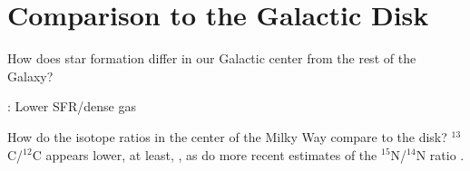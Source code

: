 \section{Comparison to the Galactic Disk}
How does star formation differ in our Galactic center from the rest of the Galaxy? 

\citet{Longmore2013b}: Lower SFR/dense gas

How do the isotope ratios in the center of the Milky Way compare to the disk? $^{13}$C/$^{12}$C appears lower, at least, \citep[e.g.,][]{Riquelme10}, as do more recent estimates of the $^{15}$N/$^{14}$N ratio \citep{AZ11}.